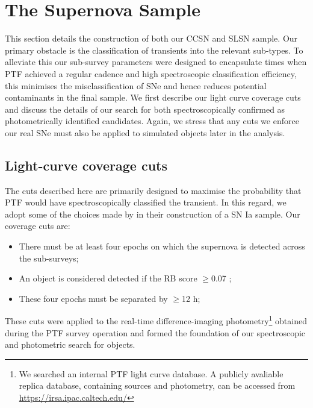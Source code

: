 \documentclass[a4paper,fleqn,usenatbib]{mnras}
\begin{document}
\section{The Supernova Sample}

This section details the construction of both our CCSN and SLSN sample. Our primary obstacle is the classification of transients into the relevant sub-types. To alleviate this our sub-survey parameters were designed to encapsulate times when PTF achieved a regular cadence and high spectroscopic classification efficiency, this minimises the misclassification of SNe and hence reduces potential contaminants in the final sample. We first describe our light curve coverage cuts and discuss the details of our search for both spectroscopically confirmed as photometrically identified candidates. Again, we stress that any cuts we enforce our real SNe must also be applied to simulated objects later in the analysis.

\subsection{Light-curve coverage cuts}
\label{sec:coverage_cuts}

The cuts described here are primarily designed to maximise the probability that PTF would have spectroscopically classified the transient. In this regard, we adopt some of the choices made by \citet{Frohmaier19} in their construction of a SN Ia sample. Our coverage cuts are:

\begin{itemize}
    \item There must be at least four epochs on which the supernova is detected across the sub-surveys;
    \item An object is considered detected if the RB score $\ge$0.07 \citep{Bloom2012};
    \item These four epochs must be separated by $\ge$12 h;
\end{itemize}

These cuts were applied to  the real-time difference-imaging photometry\footnote{We searched an internal PTF light curve database. A publicly avaliable replica database, containing sources and photometry, can be accessed from \url{https://irsa.ipac.caltech.edu/} } obtained during the PTF survey operation and formed the foundation of our spectroscopic and photometric search for objects.
\end{document}
